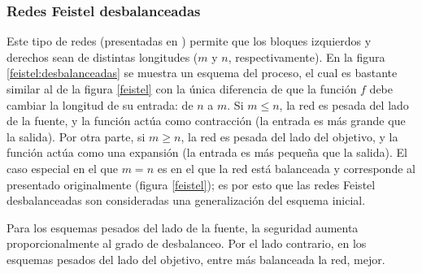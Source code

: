 %
%

\subsubsection{Redes Feistel desbalanceadas}

Este tipo de redes (presentadas en \cite{DBLP:conf/fse/SchneierK96}) permite
que los bloques izquierdos y derechos sean de distintas longitudes ($ m $ y
$ n $, respectivamente). En la figura \ref{feistel:desbalanceadas} se muestra
un esquema del proceso, el cual es bastante similar al de la figura
\ref{feistel} con la única diferencia de que la función $ f $ debe cambiar la
longitud de su entrada: de $ n $ a $ m $. Si $ m \le n $, la red es pesada del
lado de la fuente, y la función actúa como contracción (la entrada es más
grande que la salida). Por otra parte, si $ m \ge n $, la red es pesada del
lado del objetivo, y la función actúa como una expansión (la entrada es más
pequeña que la salida). El caso especial en el que $ m = n $ es en el que la
red está balanceada y corresponde al presentado originalmente (figura
\ref{feistel}); es por esto que las redes Feistel desbalanceadas son
consideradas una generalización del esquema inicial.

Para los esquemas pesados del lado de la fuente, la seguridad aumenta
proporcionalmente al grado de desbalanceo. Por el lado contrario, en los
esquemas pesados del lado del objetivo, entre más balanceada la red, mejor.
